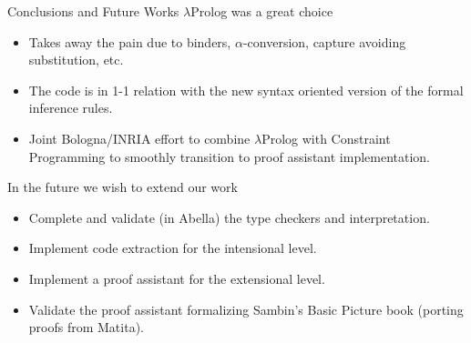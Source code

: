 \documentclass{beamer}
\begin{document}
\begin{frame}[fragile]{Conclusions and Future Works}\small
  $\lambda$Prolog was a great choice
  \begin{itemize}
   \item Takes away the pain due to binders, $\alpha$-conversion,
    capture avoiding substitution, etc.
   \item The code is in 1-1 relation with the new syntax oriented version of
    the formal inference rules.
   \item Joint Bologna/INRIA effort to combine $\lambda$Prolog with Constraint
     Programming to smoothly transition to proof assistant implementation.
  \end{itemize}
%
In the future we wish to extend our work
 \begin{itemize}
  \item Complete and validate (in Abella) the type checkers and interpretation.
  \item Implement code extraction for the intensional level.
  \item Implement a proof assistant for the extensional level.
  \item Validate the proof assistant formalizing Sambin's Basic Picture book
   (porting proofs from Matita).
 \end{itemize}
\end{frame}
\end{document}
